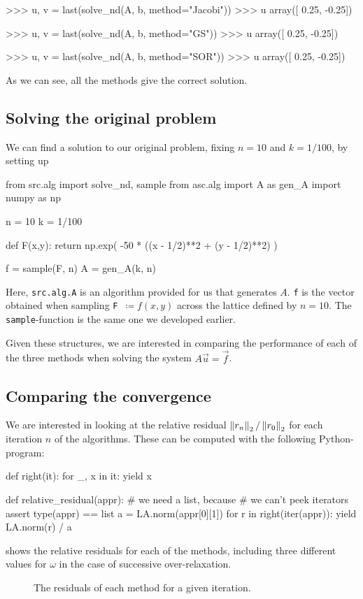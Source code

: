 \documentclass[12pt]{article}
\begin{document}
\begin{multicols}{2}
\begin{python}
>>> u, v = last(solve_nd(A, b, method="Jacobi"))
>>> u
array([ 0.25, -0.25])

>>> u, v = last(solve_nd(A, b, method="GS"))
>>> u
array([ 0.25, -0.25])

>>> u, v = last(solve_nd(A, b, method="SOR"))
>>> u
array([ 0.25, -0.25])
    \end{python}
    As we can see, all the methods give the correct solution.

    \subsection*{Solving the original problem}

    We can find a solution to our original problem,
    fixing $n = 10$ and $k = 1/100$, by setting up
    \begin{python}
from src.alg import solve_nd, sample
from asc.alg import A as gen_A
import numpy as np

n = 10
k = 1/100

def F(x,y):
    return np.exp(
        -50 * ((x - 1/2)**2 + (y - 1/2)**2)
    )

f = sample(F, n)
A = gen_A(k, n)
    \end{python}
    Here, {\tt src.alg.A} is an algorithm provided for us that generates $A$.
    {\tt f} is the vector obtained when sampling
    \mbox{{\tt F} $\coloneqq f(x, y)$} across the lattice defined by $n = 10$.
    The {\tt sample}-function is the same one we developed earlier.

    Given these structures, we are interested in comparing the performance of each of
    the three methods when solving the system $A \vec u = \vec f$.

    \subsection{Comparing the convergence}
    We are interested in looking at the relative residual
    $\Norm[2]{r_n} / \Norm[2]{r_0}$ for each iteration $n$ of the
    algorithms. These can be computed with the following Python-program:
    \begin{python}
def right(it):
    for _, x in it: yield x

def relative_residual(appr):
    # we need a list, because
    # we can't peek iterators
    assert type(appr) == list
    a = LA.norm(appr[0][1])
    for r in right(iter(appr)):
        yield LA.norm(r) / a
    \end{python}
     shows the relative residuals for each of the methods,
    including three different values for $\omega$ in the case of
    successive over-relaxation.
    \begin{figure}[H]
        \centering
        
        \caption{
            The residuals of each method for a given iteration.
        }
        \label{fig:residuals}
    \end{figure}\noindent


\end{multicols}
\end{document}
